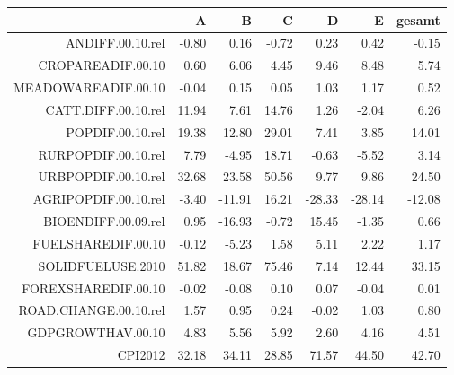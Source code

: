 \begin{table}[ht]
\centering
\begin{tabular}{rrrrrrr}
  \hline
 & A & B & C & D & E & gesamt \\ 
  \hline
ANDIFF.00.10.rel & -0.80 & 0.16 & -0.72 & 0.23 & 0.42 & -0.15 \\ 
  CROPAREADIF.00.10 & 0.60 & 6.06 & 4.45 & 9.46 & 8.48 & 5.74 \\ 
  MEADOWAREADIF.00.10 & -0.04 & 0.15 & 0.05 & 1.03 & 1.17 & 0.52 \\ 
  CATT.DIFF.00.10.rel & 11.94 & 7.61 & 14.76 & 1.26 & -2.04 & 6.26 \\ 
  POPDIF.00.10.rel & 19.38 & 12.80 & 29.01 & 7.41 & 3.85 & 14.01 \\ 
  RURPOPDIF.00.10.rel & 7.79 & -4.95 & 18.71 & -0.63 & -5.52 & 3.14 \\ 
  URBPOPDIF.00.10.rel & 32.68 & 23.58 & 50.56 & 9.77 & 9.86 & 24.50 \\ 
  AGRIPOPDIF.00.10.rel & -3.40 & -11.91 & 16.21 & -28.33 & -28.14 & -12.08 \\ 
  BIOENDIFF.00.09.rel & 0.95 & -16.93 & -0.72 & 15.45 & -1.35 & 0.66 \\ 
  FUELSHAREDIF.00.10 & -0.12 & -5.23 & 1.58 & 5.11 & 2.22 & 1.17 \\ 
  SOLIDFUELUSE.2010 & 51.82 & 18.67 & 75.46 & 7.14 & 12.44 & 33.15 \\ 
  FOREXSHAREDIF.00.10 & -0.02 & -0.08 & 0.10 & 0.07 & -0.04 & 0.01 \\ 
  ROAD.CHANGE.00.10.rel & 1.57 & 0.95 & 0.24 & -0.02 & 1.03 & 0.80 \\ 
  GDPGROWTHAV.00.10 & 4.83 & 5.56 & 5.92 & 2.60 & 4.16 & 4.51 \\ 
  CPI2012 & 32.18 & 34.11 & 28.85 & 71.57 & 44.50 & 42.70 \\ 
   \hline
\end{tabular}
\end{table}
